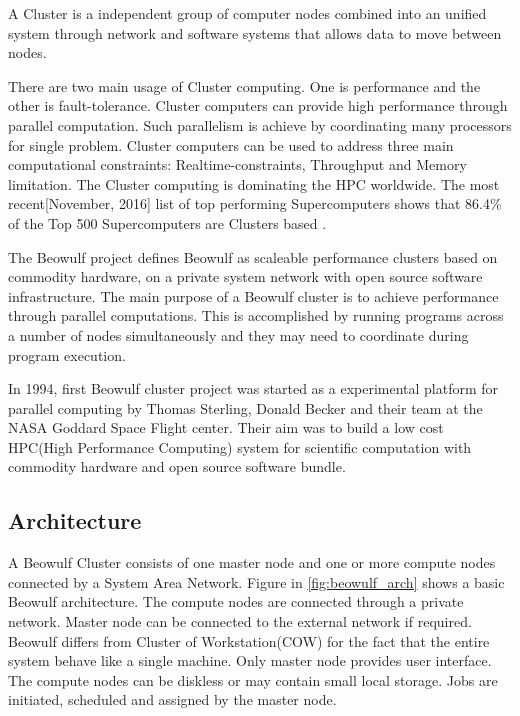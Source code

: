 \label{bg/beowulf}
A Cluster is a independent group of computer nodes combined into an unified system through network and software systems that allows data to move between nodes\citep{Gropp:beowulf}.

There are two main usage of Cluster computing. One is performance and the other is fault-tolerance. Cluster computers can provide high performance through parallel computation. Such parallelism is achieve by coordinating many processors for single problem. Cluster computers can be used to address three main computational constraints: Realtime-constraints, Throughput and Memory limitation\citep{Gropp:beowulf}. The Cluster computing is dominating the HPC worldwide. The most recent[November, 2016] list of top performing Supercomputers shows that 86.4\% of the Top 500 Supercomputers are Clusters based \citep{Top500:cluster}. 

The Beowulf project defines Beowulf as scaleable performance clusters based on commodity hardware, on a private system network with open source software infrastructure\citep{Beowulf.org}. The main purpose of a Beowulf cluster is to achieve performance through parallel computations. This is accomplished by running programs across a number of nodes simultaneously and they may need to coordinate during program execution\citep{Gropp:beowulf}.

In 1994, first Beowulf cluster project was started as a experimental platform for parallel computing by Thomas Sterling, Donald Becker and their team at the NASA Goddard Space Flight center. Their aim was to build a low cost HPC(High Performance Computing) system for scientific computation with commodity hardware and open source software bundle. \citep{Gropp:beowulf}

\subsection{Architecture}
A Beowulf Cluster consists of one master node and one or more compute nodes connected by a System Area Network. Figure in \ref{fig:beowulf_arch} shows a basic Beowulf architecture. The compute nodes are connected through a private network. Master node can be connected to the external network if required\citep{Gropp:beowulf}. Beowulf differs from Cluster of Workstation(COW) for the fact that the entire system behave like a single machine. Only master node provides user interface. The compute nodes can be diskless or may contain small local storage. Jobs are initiated, scheduled and assigned by the master node.

